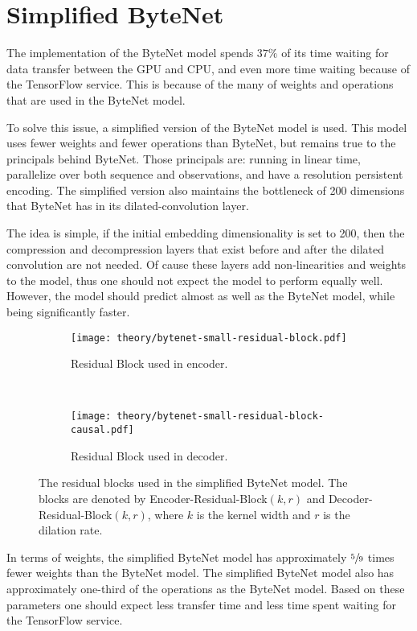 \section{Simplified ByteNet}

The implementation of the ByteNet model spends $37\%$ of its time waiting for data transfer between the GPU and CPU, and even more time waiting because of the TensorFlow service. This is because of the many of weights and operations that are used in the ByteNet model.

To solve this issue, a simplified version of the ByteNet model is used. This model uses fewer weights and fewer operations than ByteNet, but remains true to the principals behind ByteNet. Those principals are: running in linear time, parallelize over both sequence and observations, and have a resolution persistent encoding. The simplified version also maintains the bottleneck of 200 dimensions that ByteNet has in its dilated-convolution layer.

The idea is simple, if the initial embedding dimensionality is set to 200, then the compression and decompression layers that exist before and after the dilated convolution are not needed. Of cause these layers add non-linearities and weights to the model, thus one should not expect the model to perform equally well. However, the model should predict almost as well as the ByteNet model, while being significantly faster.

\begin{figure}[H]
    \centering
    \begin{subfigure}[b]{0.45\textwidth}
        \centering
        \texttt{[image: theory/bytenet-small-residual-block.pdf]}
        \caption{Residual Block used in encoder.}
    \end{subfigure}
    ~ %
    \begin{subfigure}[b]{0.45\textwidth}
        \centering
        \texttt{[image: theory/bytenet-small-residual-block-causal.pdf]}
        \caption{Residual Block used in decoder.}
    \end{subfigure}
    \caption{The residual blocks used in the simplified ByteNet model. The blocks are denoted by Encoder-Residual-Block$(k,r)$ and Decoder-Residual-Block$(k,r)$, where $k$ is the kernel width and $r$ is the dilation rate.}
    \label{fig:result:simple-bytenet:residual-block}
\end{figure}

In terms of weights, the simplified ByteNet model has approximately $\sfrac{5}{9}$ times fewer weights than the ByteNet model. The simplified ByteNet model also has approximately one-third of the operations as the ByteNet model. Based on these parameters one should expect less transfer time and less time spent waiting for the TensorFlow service.

